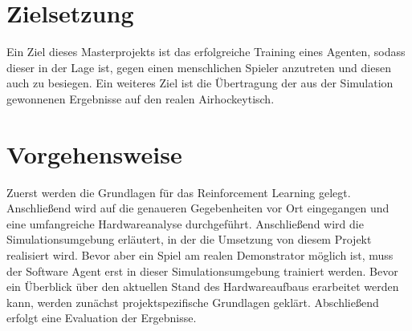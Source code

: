 \section{Zielsetzung}
\label{sect:Zielsetzung}
Ein Ziel dieses Masterprojekts ist das erfolgreiche Training eines Agenten, sodass dieser in der Lage ist, gegen einen menschlichen Spieler anzutreten und diesen auch zu besiegen. Ein weiteres Ziel ist die Übertragung der aus der Simulation gewonnenen Ergebnisse auf den realen Airhockeytisch.

\section{Vorgehensweise}
\label{sect:Vorgehensweise}
Zuerst werden die Grundlagen für das Reinforcement Learning gelegt. Anschließend wird auf die genaueren Gegebenheiten vor Ort eingegangen und eine umfangreiche Hardwareanalyse durchgeführt.
Anschließend wird die Simulationsumgebung erläutert, in der die Umsetzung von diesem Projekt realisiert wird. Bevor aber ein Spiel am realen Demonstrator möglich ist, muss der Software Agent erst in dieser Simulationsumgebung trainiert werden. Bevor ein Überblick über den aktuellen Stand des Hardwareaufbaus erarbeitet werden kann, werden zunächst projektspezifische Grundlagen geklärt. 
Abschließend erfolgt eine Evaluation der Ergebnisse.



\newpage
